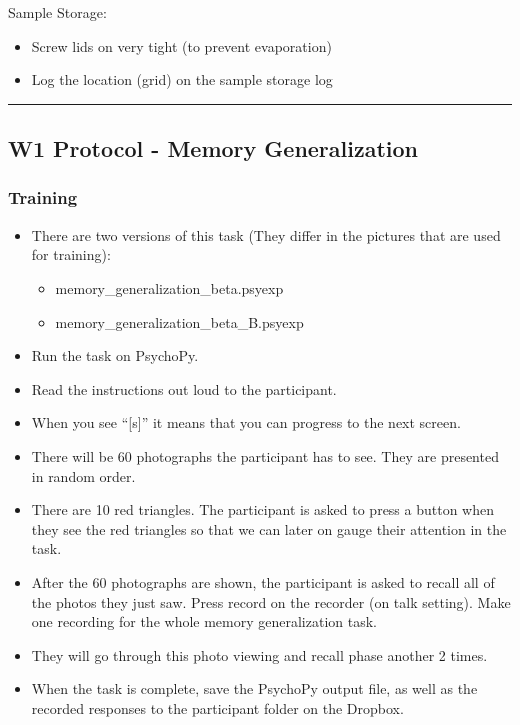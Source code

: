 \documentclass[]{book}
\providecommand{\tightlist}{%
  \setlength{\itemsep}{0pt}\setlength{\parskip}{0pt}}
\begin{document}
Sample Storage:

\begin{itemize}
\tightlist
\item
  Screw lids on very tight (to prevent evaporation)
\item
  Log the location (grid) on the sample storage log
\end{itemize}

\begin{center}\rule{0.5\linewidth}{0.5pt}\end{center}

\hypertarget{w1-protocol---memory-generalization}{%
\subsection{W1 Protocol - Memory Generalization}\label{w1-protocol---memory-generalization}}

\hypertarget{training}{%
\subsubsection{Training}\label{training}}

\begin{itemize}
\tightlist
\item
  There are two versions of this task (They differ in the pictures that are used for training):

  \begin{itemize}
  \tightlist
  \item
    memory\_generalization\_beta.psyexp
  \item
    memory\_generalization\_beta\_B.psyexp
  \end{itemize}
\item
  Run the task on PsychoPy.
\item
  Read the instructions out loud to the participant.
\item
  When you see ``{[}s{]}'' it means that you can progress to the next screen.
\item
  There will be 60 photographs the participant has to see. They are presented in random order.
\item
  There are 10 red triangles. The participant is asked to press a button when they see the red triangles so that we can later on gauge their attention in the task.
\item
  After the 60 photographs are shown, the participant is asked to recall all of the photos they just saw. Press record on the recorder (on talk setting). Make one recording for the whole memory generalization task.
\item
  They will go through this photo viewing and recall phase another 2 times.
\item
  When the task is complete, save the PsychoPy output file, as well as the recorded responses to the participant folder on the Dropbox.
\end{itemize}
\end{document}
